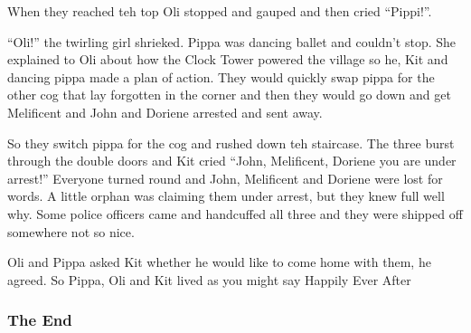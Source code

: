 When they reached teh top Oli stopped and gauped and then cried
``Pippi!''.

``Oli!'' the twirling girl shrieked. Pippa was dancing ballet and
couldn't stop. She explained to Oli about how the Clock Tower powered
the village so he, Kit and dancing pippa made a plan of action. They
would quickly swap pippa for the other cog that lay forgotten in the
corner and then they would go down and get Melificent and John and
Doriene arrested and sent away.

So they switch pippa for the cog and rushed down teh staircase. The
three burst through the double doors and Kit cried ``John, Melificent,
Doriene you are under arrest!'' Everyone turned round and John,
Melificent and Doriene were lost for words. A little orphan was claiming
them under arrest, but they knew full well why. Some police officers
came and handcuffed all three and they were shipped off somewhere not so
nice.

Oli and Pippa asked Kit whether he would like to come home with them, he
agreed. So Pippa, Oli and Kit lived as you might say Happily Ever After

\subsubsection{The End}\label{the-end}
